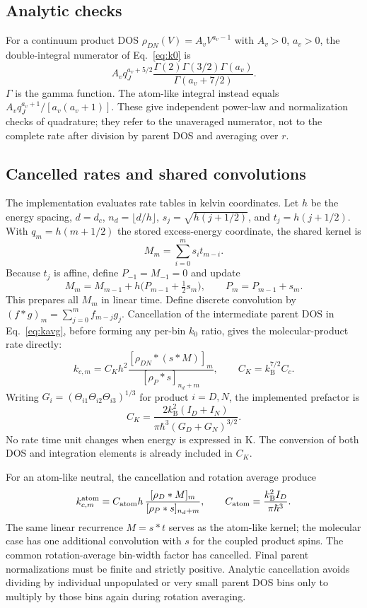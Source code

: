 \documentclass[10pt,a4paper]{article}
\newcommand{\kb}{k_{\mathrm B}}
\begin{document}
\subsection{Analytic checks}
For a continuum product DOS $\rho_{DN}(V)=A_v V^{a_v-1}$ with
$A_v>0$, $a_v>0$, the double-integral numerator of Eq.~\eqref{eq:k0} is
\[
 A_v q_J^{a_v+5/2}
 \frac{\Gamma(2)\Gamma(3/2)\Gamma(a_v)}{\Gamma(a_v+7/2)}.
\]
$\Gamma$ is the gamma function. The atom-like integral instead equals
$A_v q_J^{a_v+1}/[a_v(a_v+1)]$.
These give independent power-law and normalization checks of quadrature;
they refer to the unaveraged numerator, not to the complete rate after
division by parent DOS and averaging over $r$.

\clearpage
\subsection{Cancelled rates and shared convolutions}
The implementation evaluates rate tables in kelvin coordinates. Let $h$ be
the energy spacing, $d=d_c$, $n_d=\lfloor d/h\rfloor$,
$s_j=\sqrt{h(j+1/2)}$, and $t_j=h(j+1/2)$. With
$q_m=h(m+1/2)$ the stored excess-energy coordinate, the shared kernel is
\[
 M_m=\sum_{i=0}^m s_i t_{m-i}.
\]
Because $t_j$ is affine, define $P_{-1}=M_{-1}=0$ and update
\begin{equation}
 M_m=M_{m-1}+h\bigl(P_{m-1}+\tfrac12s_m\bigr),\qquad
 P_m=P_{m-1}+s_m.
\label{eq:linearmesh}
\end{equation}
This prepares all $M_m$ in linear time. Define discrete convolution by
$(f*g)_m=\sum_{j=0}^m f_{m-j}g_j$. Cancellation of the intermediate parent
DOS in Eq.~\eqref{eq:kavg}, before forming any per-bin $k_0$ ratio, gives
the molecular-product rate directly:
\begin{equation}
 k_{c,m}=C_Kh^2\frac{[\rho_{DN}*(s*M)]_m}
 {[\rho_P*s]_{n_d+m}},\qquad C_K=\kb^{7/2}C_c.
 \label{eq:discreteavg}
\end{equation}
Writing $G_i=(\Theta_{i1}\Theta_{i2}\Theta_{i3})^{1/3}$ for product $i=D,N$,
the implemented prefactor is
\[
 C_K=\frac{2\kb^2(I_D+I_N)}{\pi\hbar^3(G_D+G_N)^{3/2}}.
\]
No rate time unit changes when energy is expressed in K. The conversion
of both DOS and integration elements is already included in $C_K$.

For an atom-like neutral, the cancellation and rotation average produce
\[
 k_{c,m}^{\rm atom}=C_{\rm atom}h\,
 \frac{[\rho_D*M]_m}{[\rho_P*s]_{n_d+m}},\qquad
 C_{\rm atom}=\frac{\kb^2I_D}{\pi\hbar^3}.
\]
The same linear recurrence $M=s*t$ serves as the atom-like kernel; the
molecular case has one additional convolution with $s$ for the coupled
product spins. The common rotation-average bin-width factor has cancelled.
Final parent normalizations must be finite and strictly positive. Analytic
cancellation avoids dividing by individual unpopulated or very small parent
DOS bins only to multiply by those bins again during rotation averaging.
\end{document}
